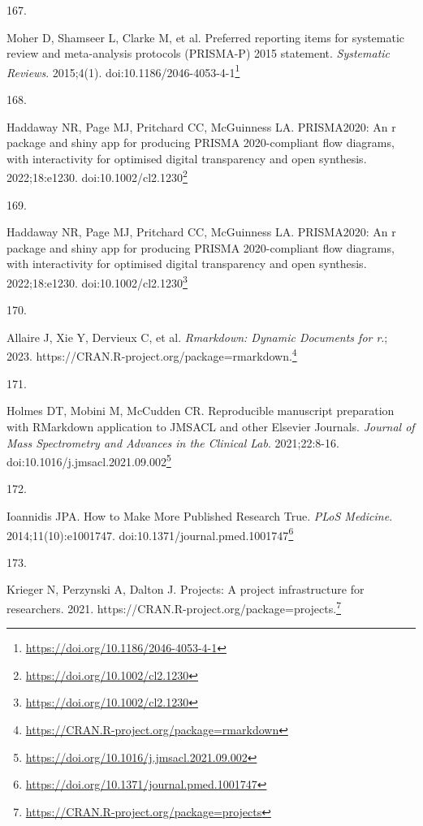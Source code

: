 \documentclass[
  a4paper,
]{book}
\newlength{\cslhangindent}
\newlength{\csllabelwidth}
\newlength{\cslentryspacingunit} %
\newenvironment{CSLReferences}[2] %
 {%
  \setlength{\parindent}{0pt}
  \ifodd #1
  \let\oldpar\par
  \def\par{\hangindent=\cslhangindent\oldpar}
  \fi
  \setlength{\parskip}{#2\cslentryspacingunit}
 }%
 {}
\newcommand{\CSLLeftMargin}[1]{\parbox[t]{\csllabelwidth}{#1}}
\newcommand{\CSLRightInline}[1]{\parbox[t]{\linewidth - \csllabelwidth}{#1}\break}
\renewcommand{\href}[2]{#2\footnote{\url{#1}}}
\begin{document}
\begin{CSLReferences}{0}{0}
\leavevmode{}%
\CSLLeftMargin{167. }%
\CSLRightInline{Moher D, Shamseer L, Clarke M, et al. Preferred reporting items for systematic review and meta-analysis protocols (PRISMA-P) 2015 statement. \emph{Systematic Reviews}. 2015;4(1). doi:\href{https://doi.org/10.1186/2046-4053-4-1}{10.1186/2046-4053-4-1}}

\leavevmode{}%
\CSLLeftMargin{168. }%
\CSLRightInline{Haddaway NR, Page MJ, Pritchard CC, McGuinness LA. PRISMA2020: An r package and shiny app for producing PRISMA 2020-compliant flow diagrams, with interactivity for optimised digital transparency and open synthesis. 2022;18:e1230. doi:\href{https://doi.org/10.1002/cl2.1230}{10.1002/cl2.1230}}

\leavevmode{}%
\CSLLeftMargin{169. }%
\CSLRightInline{Haddaway NR, Page MJ, Pritchard CC, McGuinness LA. PRISMA2020: An r package and shiny app for producing PRISMA 2020-compliant flow diagrams, with interactivity for optimised digital transparency and open synthesis. 2022;18:e1230. doi:\href{https://doi.org/10.1002/cl2.1230}{10.1002/cl2.1230}}

\leavevmode{}%
\CSLLeftMargin{170. }%
\CSLRightInline{Allaire J, Xie Y, Dervieux C, et al. \emph{Rmarkdown: Dynamic Documents for r}.; 2023. \href{https://CRAN.R-project.org/package=rmarkdown}{https://CRAN.R-project.org/package=rmarkdown.}}

\leavevmode{}%
\CSLLeftMargin{171. }%
\CSLRightInline{Holmes DT, Mobini M, McCudden CR. Reproducible manuscript preparation with RMarkdown application to JMSACL and other Elsevier Journals. \emph{Journal of Mass Spectrometry and Advances in the Clinical Lab}. 2021;22:8-16. doi:\href{https://doi.org/10.1016/j.jmsacl.2021.09.002}{10.1016/j.jmsacl.2021.09.002}}

\leavevmode{}%
\CSLLeftMargin{172. }%
\CSLRightInline{Ioannidis JPA. How to Make More Published Research True. \emph{PLoS Medicine}. 2014;11(10):e1001747. doi:\href{https://doi.org/10.1371/journal.pmed.1001747}{10.1371/journal.pmed.1001747}}

\leavevmode{}%
\CSLLeftMargin{173. }%
\CSLRightInline{Krieger N, Perzynski A, Dalton J. Projects: A project infrastructure for researchers. 2021. \href{https://CRAN.R-project.org/package=projects}{https://CRAN.R-project.org/package=projects.}}


\end{CSLReferences}
\end{document}

